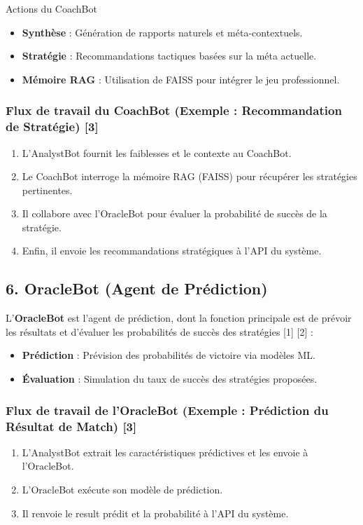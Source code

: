 \documentclass[11pt,a4paper]{article}
\begin{document}
\begin{WorkflowStep}{Actions du CoachBot}
\begin{itemize}[label=\color{valorantRed}\faLightbulb, itemsep=6pt]
    \item \textbf{Synthèse} : Génération de rapports naturels et méta-contextuels.
    \item \textbf{Stratégie} : Recommandations tactiques basées sur la méta actuelle.
    \item \textbf{Mémoire RAG} : Utilisation de FAISS pour intégrer le jeu professionnel.
\end{itemize}
\end{WorkflowStep}

\subsubsection*{Flux de travail du CoachBot (Exemple : Recommandation de Stratégie) [3]}
\begin{enumerate}
    \item L'AnalystBot fournit les faiblesses et le contexte au CoachBot.
    \item Le CoachBot interroge la mémoire RAG (FAISS) pour récupérer les stratégies pertinentes.
    \item Il collabore avec l'OracleBot pour évaluer la probabilité de succès de la stratégie.
    \item Enfin, il envoie les recommandations stratégiques à l'API du système.
\end{enumerate}

\subsection{6. OracleBot (Agent de Prédiction)}

L'\textbf{OracleBot} est l'agent de prédiction, dont la fonction principale est de prévoir les résultats et d'évaluer les probabilités de succès des stratégies [1] [2] :

\begin{itemize}[label=\color{valorantRed}\faChartLine, itemsep=6pt]
    \item \textbf{Prédiction} : Prévision des probabilités de victoire via modèles ML.
    \item \textbf{Évaluation} : Simulation du taux de succès des stratégies proposées.
\end{itemize}

\subsubsection*{Flux de travail de l'OracleBot (Exemple : Prédiction du Résultat de Match) [3]}
\begin{enumerate}
    \item L'AnalystBot extrait les caractéristiques prédictives et les envoie à l'OracleBot.
    \item L'OracleBot exécute son modèle de prédiction.
    \item Il renvoie le result prédit et la probabilité à l'API du système.
\end{enumerate}
\end{document}
